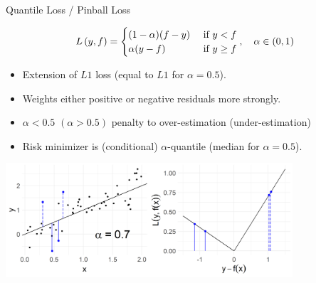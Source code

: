 \documentclass[11pt,compress,t,notes=noshow, xcolor=table]{beamer}
\begin{document}

\begin{vbframe}{Quantile Loss / Pinball Loss}
\vspace{-0.3cm}

\small
$$
L\left(y, f\right) = \begin{cases} (1 - \alpha) (f - y) & \text{ if } y < f\\
\alpha (y - f) & \text{ if } y \ge f
\end{cases}, \quad \alpha \in (0, 1)
$$


\normalsize
\begin{itemize}
\item Extension of $L1$ loss (equal to $L1$ for $\alpha = 0.5$).
\item Weights either positive or negative residuals more strongly. 
\item $\alpha<0.5$ $(\alpha>0.5)$ penalty to over-estimation (under-estimation)
\item Risk minimizer is (conditional) 
    $\alpha$-quantile (median for $\alpha=0.5$).
\end{itemize}

\vfill

\begin{center}
\includegraphics[width = 0.8\textwidth]{figure/loss_quantile.png}
\end{center}




\end{vbframe}




\endlecture
\end{document}

